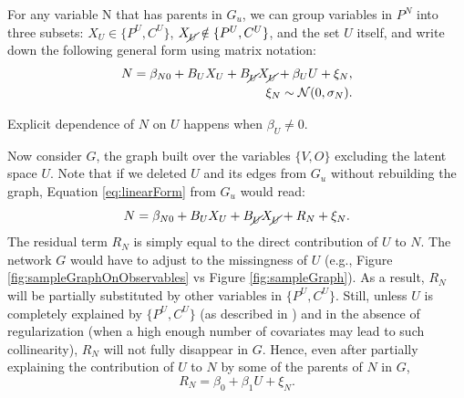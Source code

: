 \documentclass[letterpaper]{article}
\begin{document}
For any variable N that has parents in $G_u$, we can group variables in $P^N$ into three subsets: $X_U \in \{P^U, C^U\}$, $X_{\cancel{U}} \notin \{P^U, C^U\}$, and the set $U$ itself, and write down the following general form using matrix notation:
\begin{equation}
\begin{split}
N = \beta_{N0} + B_U X_U + B_{\cancel{U}} X_{\cancel{U}} + \beta_U U + \xi_N,\\\xi_N \sim \mathcal{N}(0, \sigma_{N}).
\end{split}
\label{eq:linearForm}
\end{equation}

Explicit dependence of $N$ on $U$ happens when $\beta_U \neq 0$.  

Now consider $G$,  the graph built over the variables $\{V, O\}$ excluding the latent space $U$.  Note that if we deleted $U$ and its edges from $G_u$ without rebuilding the graph, Equation \ref{eq:linearForm} from $G_u$ would read:
\begin{equation}
N = \beta_{N0} + B_U X_U + B_{\cancel{U}} X_{\cancel{U}} + R_N + \xi_N. 
\label{eq:linearFormNoU}
\end{equation}
The residual term $R_N$ is simply equal to the direct contribution of $U$ to $N$.  The network $G$ would have to adjust to the missingness of $U$ (e.g., Figure \ref{fig:sampleGraphOnObservables} vs Figure \ref{fig:sampleGraph}).  As a result, $R_N$ will be partially substituted by other variables in $\{P^U, C^U\}$.  Still, unless $U$ is completely explained by $\{P^U, C^U\}$ (as described in \cite{damour_multi-cause_2019}) and in the absence of regularization (when a high enough number of covariates may lead to such collinearity), $R_N$ will not fully disappear in $G$.  Hence, even after partially explaining the contribution of $U$ to $N$ by some of the parents of $N$ in $G$, 
\begin{equation}
R_N = \beta_0 + \beta_1 U + \xi_N.
\label{eq:residualColumn}
\end{equation}
\end{document}
